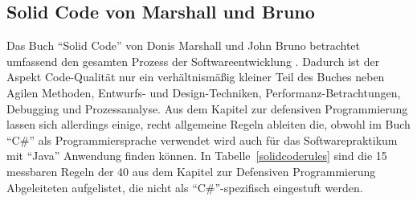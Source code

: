 \documentclass[da,ngerman]{stthesis}
\begin{document}
			\subsection{Solid Code von Marshall und Bruno}
				Das Buch "`Solid Code"' von Donis Marshall und John Bruno betrachtet umfassend den gesamten Prozess der Softwareentwicklung \cite{SolidCode}. \newline
				Dadurch ist der Aspekt Code-Qualität nur ein verhältnismäßig kleiner Teil des Buches neben Agilen Methoden, Entwurfs- und Design-Techniken, Performanz-Betrachtungen, Debugging und Prozessanalyse. Aus dem Kapitel zur defensiven Programmierung lassen sich allerdings einige, recht allgemeine Regeln ableiten die, obwohl im Buch "`C\#"' als Programmiersprache verwendet wird auch für das Softwarepraktikum mit "`Java"' Anwendung finden können. In Tabelle~\ref{solidcoderules} sind die 15 messbaren Regeln der 40 aus dem Kapitel zur Defensiven Programmierung Abgeleiteten aufgelistet, die nicht als "`C\#"'-spezifisch eingestuft werden.
\end{document}
